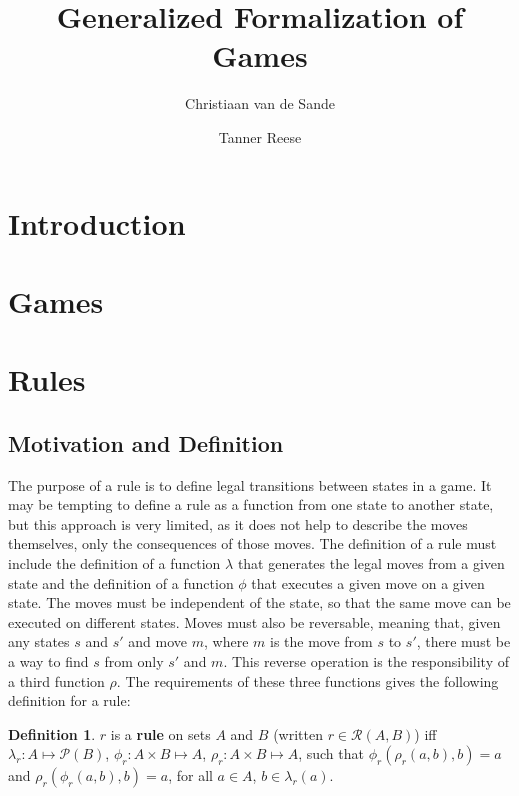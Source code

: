 \documentclass{article}
\title{Generalized Formalization of Games}
\author{Christiaan van de Sande \and Tanner Reese}
\theoremstyle{definition}
\newtheorem{definition}{Definition}[subsection]
\theoremstyle{plain}
\def\rule{\mathcal{R}}
\begin{document}
\maketitle

\section{Introduction}
 
\section{Games}

\section{Rules}

\subsection{Motivation and Definition} %

The purpose of a rule is to define legal transitions between states in a game.
It may be tempting to define a rule as a function from one state to another state, but this approach is very limited,
as it does not help to describe the moves themselves, only the consequences of those moves.
The definition of a rule must include
the definition of a function $ \lambda $ that generates the legal moves from a given state
and the definition of a function $ \phi $ that executes a given move on a given state.
The moves must be independent of the state, so that the same move can be executed on different states.
Moves must also be reversable,
meaning that, given any states $ s $ and $ s' $ and move $ m $,
where $ m $ is the move from $ s $ to $ s' $,
there must be a way to find $ s $ from only $ s' $ and $ m $.
This reverse operation is the responsibility of a third function $ \rho $.
The requirements of these three functions gives the following definition for a rule:

 \begin{definition}
  $ r $ is a \textbf{rule} on sets $ A $ and $ B $ (written  $ r \in \rule (A, B) $) iff
  $ \lambda_r : A          \mapsto \mathcal{P} (B) $,
  $    \phi_r : A \times B \mapsto A $,
  $    \rho_r : A \times B \mapsto A $,
  such that $ \phi_r (\rho_r (a, b), b) = a $
  and $ \rho_r (\phi_r (a, b), b) = a $,
  for all $ a \in A $, $ b \in \lambda_r (a) $.
\end{definition}
\end{document}
